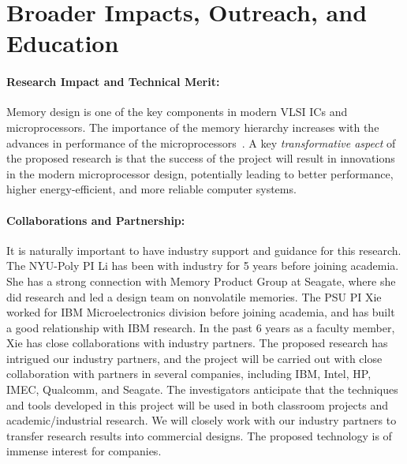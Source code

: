 
\section{Broader Impacts, Outreach, and Education}

\paragraph{\textbf{Research Impact and Technical Merit:}}
Memory design is one of the key components in modern VLSI ICs and microprocessors. The importance of the memory hierarchy
increases with the advances in performance of the
microprocessors~\cite{ITRS07}.  A key \textit{transformative aspect} of the proposed research is
that the success of the project will result in innovations in the modern microprocessor design,
potentially leading to better performance, higher energy-efficient, and more reliable
computer systems.


\paragraph{\textbf{Collaborations and Partnership:}} It is naturally important to have industry support and guidance for this research.  The NYU-Poly PI Li has been with industry for 5 years before joining academia.  She has a strong connection with Memory
Product Group at Seagate, where she did research and led a design team on nonvolatile memories.    The PSU PI Xie worked for IBM Microelectronics division
before joining academia, and has built a good relationship with IBM
research. In the past 6 years as a faculty member, Xie has close collaborations with industry
partners. The proposed research has intrigued our industry partners, and the project will be
carried out with close collaboration with partners in several
companies, including IBM, Intel, HP, IMEC, Qualcomm, and Seagate.
The investigators
anticipate that the techniques and tools developed in this project will be
used in both classroom projects and academic/industrial
research. We will closely work with our industry partners to
transfer research results into commercial designs. The proposed
technology is of immense interest for companies.


